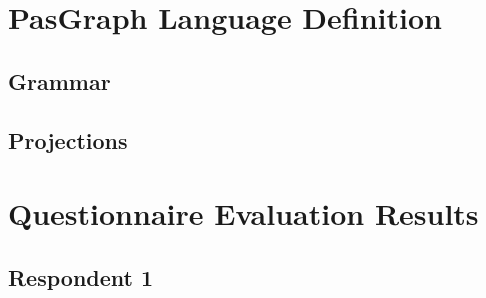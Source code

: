 \section{PasGraph Language Definition}\label{pascalLanguageDef}

\subsection{Grammar}


\subsection{Projections}\label{pascalLanguageDefEditor}











\section{Questionnaire Evaluation Results}\label{questionnaireEvalResults}

\subsection{Respondent 1}
